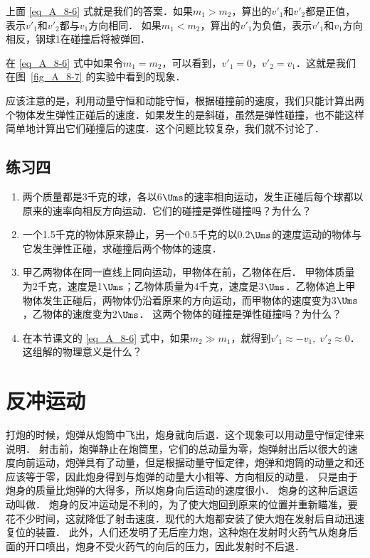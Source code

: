 上面 \eqref{eq_A_8-6} 式就是我们的答案．如果$m_1>m_2$，算出的$v'_1$和$v'_2$都是正值，表示$v'_1$和$v'_2$都与$v_1$方向相同．
如果$m_1<m_2$，算出的$v'_1$为负值，表示$v'_1$和$v_1$方向相反，钢球1在碰撞后将被弹回．

在 \eqref{eq_A_8-6} 式中如果令$m_1=m_2$，可以看到，$v'_1=0$，$v'_2=v_1$．这就是我们在图~\ref{fig_A_8-7} 的实验中看到的现象．

应该注意的是，利用动量守恒和动能守恒，根据碰撞前的速度，我们只能计算出两个物体发生弹性正碰后的速度．如果发生的是斜碰，虽然是弹性碰撞，也不能这样简单地计算出它们碰撞后的速度．这个问题比较复杂，我们就不讨论了．

\subsection*{练习四}
\begin{enumerate}
\item 两个质量都是3千克的球，各以6$\Ums$的速率相向运动，发生正碰后每个球都以原来的速率向相反方向运动．它们的碰撞是弹性碰撞吗？为什么？
\item 一个1.5千克的物体原来静止，另一个0.5千克的以0.2$\Ums$的速度运动的物体与它发生弹性正碰，求碰撞后两个物体的速度．
\item 甲乙两物体在同一直线上同向运动，甲物体在前，乙物体在后．
甲物体质量为2千克，速度是1$\Ums$；乙物体质量为4千克，速度是3$\Ums$．乙物体追上甲物体发生正碰后，两物体仍沿着原来的方向运动，而甲物体的速度变为3$\Ums$，乙物体的速度变为2$\Ums$．
这两个物体的碰撞是弹性碰撞吗？为什么？
\item 在本节课文的 \eqref{eq_A_8-6} 式中，如果$m_2\gg m_1$，就得到$v'_1\approx -v_1,\; v'_2\approx 0$．这组解的物理意义是什么？
\end{enumerate}


\section{反冲运动}
打炮的时候，炮弹从炮筒中飞出，炮身就向后退．这个现象可以用动量守恒定律来说明．
射击前，炮弹静止在炮筒里，它们的总动量为零，炮弹射出后以很大的速度向前运动，炮弹具有了动量，但是根据动量守恒定律，炮弹和炮筒的动量之和还应该等于零，因此炮身得到与炮弹的动量大小相等、方向相反的动量．
只是由于炮身的质量比炮弹的大得多，所以炮身向后运动的速度很小．
炮身的这种后退运动叫做．
炮身的反冲运动是不利的，为了使大炮回到原来的位置并重新瞄准，要花不少时间，这就降低了射击速度．现代的大炮都安装了使大炮在发射后自动迅速复位的装置．
此外，人们还发明了无后座力炮，这种炮在发射时火药气从炮身后面的开口喷出，炮身不受火药气的向后的压力，因此发射时不后退．

